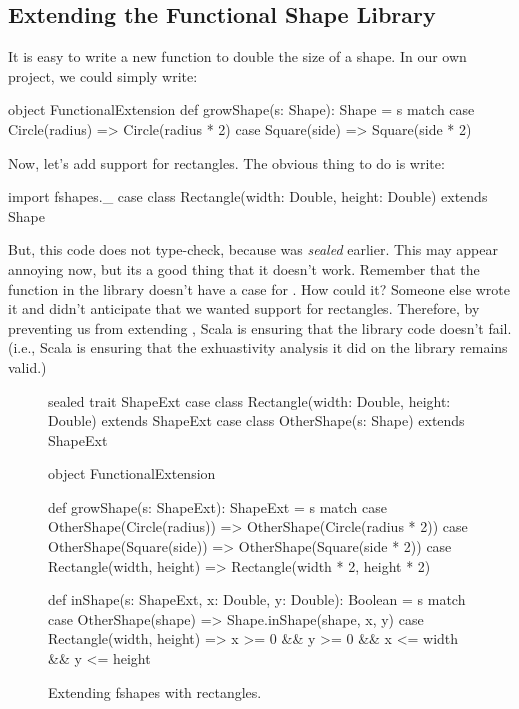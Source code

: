 \documentclass[9pt]{extbook}
\begin{document}
\subsection{Extending the Functional Shape Library}

It is easy to write a new function to double the size of a shape. In our
own project, we could simply write:

\begin{scalacode}
object FunctionalExtension {
  def growShape(s: Shape): Shape = s match {
    case Circle(radius) => Circle(radius * 2)
    case Square(side) => Square(side * 2)
  }
}
\end{scalacode}

Now, let's add support for rectangles. The obvious thing to do is write:
\begin{scalacode}
import fshapes._
case class Rectangle(width: Double, height: Double) extends Shape
\end{scalacode}
But, this code does not type-check, because  was \emph{sealed}
earlier. This may appear annoying now, but its a good thing that it doesn't work.
Remember that the  function in the library doesn't
have a case for . How could it? Someone else wrote it
and didn't anticipate that we wanted support for rectangles. Therefore, by
preventing us from extending , Scala is ensuring that
the library code doesn't fail. (i.e., Scala is ensuring that the exhuastivity
analysis it did on the library remains valid.)

\begin{figure}
\begin{scalacode}
sealed trait ShapeExt
case class Rectangle(width: Double, height: Double) extends ShapeExt
case class OtherShape(s: Shape) extends ShapeExt

object FunctionalExtension {
  def growShape(s: ShapeExt): ShapeExt = s match {
    case OtherShape(Circle(radius)) => OtherShape(Circle(radius * 2))
    case OtherShape(Square(side)) => OtherShape(Square(side * 2))
    case Rectangle(width, height) => Rectangle(width * 2, height * 2)
  }

  def inShape(s: ShapeExt, x: Double, y: Double): Boolean = s match {
    case OtherShape(shape) => Shape.inShape(shape, x, y)
    case Rectangle(width, height) => x >= 0 && y >= 0 && x <= width && y <= height
  }
}
\end{scalacode}
\caption{Extending fshapes with rectangles.}
\label{fshapesext}
\end{figure}
\end{document}

